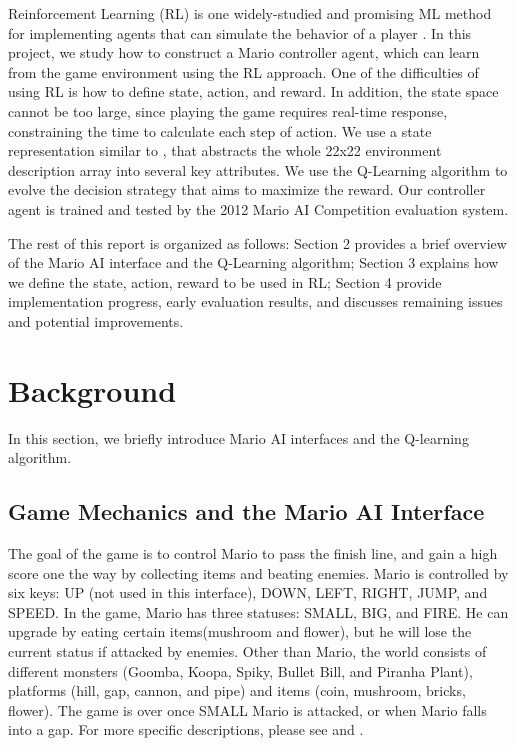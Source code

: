 Reinforcement Learning (RL) \cite{sutton1998reinforcement} is one widely-studied and promising ML method for implementing agents that can simulate the behavior of a player \cite{tsay2011evolving}. In this project, we study how to construct a Mario controller agent, which can learn from the game environment using the RL approach. One of the difficulties of using RL is how to define state, action, and reward. In addition, the state space cannot be too large, since playing the game requires real-time response, constraining the time to calculate each step of action. We use a state representation similar to \cite{tsay2011evolving}, that abstracts the whole 22x22 environment description array into several key attributes. We use the Q-Learning algorithm to evolve the decision strategy that aims to maximize the reward. Our controller agent is trained and tested by the 2012 Mario AI Competition evaluation system. 

The rest of this report is organized as follows: Section 2 provides a brief overview of the Mario AI interface and the Q-Learning algorithm; Section 3 explains how we define the state, action, reward to be used in RL; Section 4 provide implementation progress, early evaluation results, and discusses remaining issues and potential improvements.

\section{Background}
In this section, we briefly introduce Mario AI interfaces and the Q-learning algorithm.

\subsection{Game Mechanics and the Mario AI Interface}
The goal of the game is to control Mario to pass the finish line, and gain a high score one the way by collecting items and beating enemies. Mario is controlled by six keys: UP (not used in this interface), DOWN, LEFT, RIGHT, JUMP, and SPEED. In the game, Mario has three statuses: SMALL, BIG, and FIRE. He can upgrade by eating certain items(mushroom and flower), but he will lose the current status if attacked by enemies. Other than Mario, the world consists of different monsters (Goomba, Koopa, Spiky, Bullet Bill, and Piranha Plant), platforms (hill, gap, cannon, and pipe) and items (coin, mushroom, bricks, flower). The game is over once SMALL Mario is attacked, or when Mario falls into a gap. For more specific descriptions, please see \cite{tsay2011evolving} and \cite{togelius20102009}.

